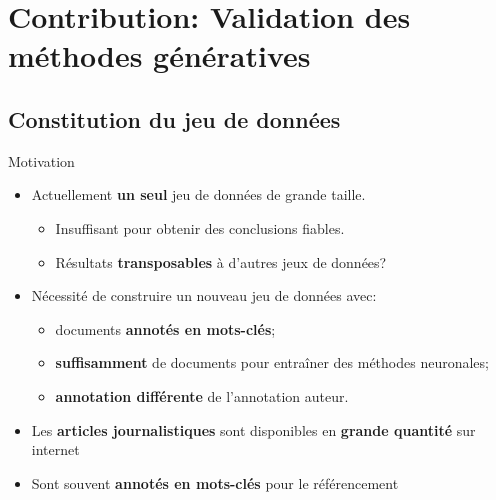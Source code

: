 \section{Contribution: Validation des méthodes génératives}

\subsection{Constitution du jeu de données}

\begin{frame}{Motivation}
    
    \begin{itemize}
        \item Actuellement \textbf{un seul} jeu de données de grande taille.
        \begin{itemize}
            \item Insuffisant pour obtenir des conclusions fiables. %
            \item Résultats \textbf{transposables} à d'autres jeux de données?
        \end{itemize}
        
        \item Nécessité de construire un nouveau jeu de données avec:
        \begin{itemize}
            \item documents \textbf{annotés en mots-clés};
            \item \textbf{suffisamment} de documents pour entraîner des méthodes neuronales;
            \item \textbf{annotation différente} de l'annotation auteur.
        \end{itemize}
    \end{itemize}
    
    \pause
    
    \begin{itemize}
        \item Les \textbf{articles journalistiques} sont disponibles en \textbf{grande quantité} sur internet
        \item Sont souvent \textbf{annotés en mots-clés} pour le référencement
    \end{itemize}
    
\end{frame}
